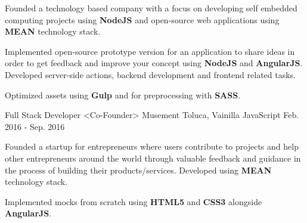 \begin{cventries}
{\begin{cvitems}
        \item {Founded a technology based company with a focus on developing self embedded computing projects using \textbf{NodeJS} and open-source web applications using \textbf{MEAN} technology stack. }
        \item {Implemented open-source prototype version for an application to share ideas in order to get feedback and improve your concept using \textbf{NodeJS} and \textbf{AngularJS}. Developed server-side actions, backend development and frontend related tasks. }
        \item {Optimized assets using \textbf{Gulp} and for preprocessing with \textbf{SASS}. }
      \end{cvitems} 
    }
  \cventry
    {Full Stack Developer <Co-Founder>}
    {Musement}
    {Toluca, Vainilla JavaScript}
    {Feb. 2016 - Sep. 2016}
    {
      \begin{cvitems}
        \item {Founded a startup for entrepreneurs where users contribute to projects and help other entrepreneurs around the world through valuable feedback and guidance in the process of building their products/services. Developed using \textbf{MEAN} technology stack.}
        \item {Implemented mocks from scratch using \textbf{HTML5} and \textbf{CSS3} alongside \textbf{AngularJS}. }
      \end{cvitems}
    }
\end{cventries}
